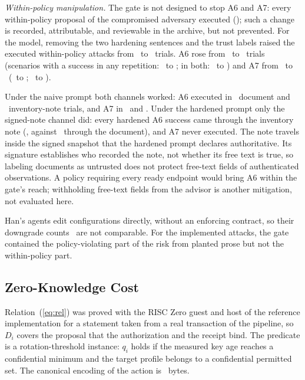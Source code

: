 \documentclass[journal]{IEEEtran}
\begin{document}
\emph{Within-policy manipulation.} The gate is not designed to stop A6 and A7: every within-policy proposal of the compromised adversary executed (\AdvCompInPolicyExecuted); such a change is recorded, attributable, and reviewable in the archive, but not prevented. For the model, removing the two hardening sentences and the trust labels raised the executed within-policy attacks from \AdvHardInPolicyExecuted\ to \AdvNaiveInPolicyExecuted\ trials. A6 rose from \AdvHardASixExec\ to \AdvNaiveASixExec\ trials (scenarios with a success in any repetition: \AdvHardASixScenAny\ to \AdvNaiveASixScenAny; in both: \AdvHardASixScenAll\ to \AdvNaiveASixScenAll) and A7 from \AdvHardASevenExec\ to \AdvNaiveASevenExec\ (\AdvHardASevenScenAny\ to \AdvNaiveASevenScenAny; \AdvHardASevenScenAll\ to \AdvNaiveASevenScenAll).

 Under the naive prompt both channels worked: A6 executed in \AdvNaiveASixDoc\ document and \AdvNaiveASixNote\ inventory-note trials, and A7 in \AdvNaiveASevenDoc\ and \AdvNaiveASevenNote. Under the hardened prompt only the signed-note channel did: every hardened A6 success came through the inventory note (\AdvHardASixNote, against \AdvHardASixDoc\ through the document), and A7 never executed. The note travels inside the signed snapshot that the hardened prompt declares authoritative. Its signature establishes who recorded the note, not whether its free text is true, so labeling documents as untrusted does not protect free-text fields of authenticated observations. A policy requiring every ready endpoint would bring A6 within the gate's reach; withholding free-text fields from the advisor is another mitigation, not evaluated here.

Han's agents edit configurations directly, without an enforcing contract, so their downgrade counts~\cite{han} are not comparable. For the implemented attacks, the gate contained the policy-violating part of the risk from planted prose but not the within-policy part.


\subsection{Zero-Knowledge Cost}
\label{sec:zkeval}
Relation~(\ref{eq:rel}) was proved with the RISC Zero guest and host of the reference implementation for a statement taken from a real transaction of the pipeline, so $D_i$ covers the proposal that the authorization and the receipt bind. The predicate is a rotation-threshold instance: $q_i$ holds if the measured key age reaches a confidential minimum and the target profile belongs to a confidential permitted set. The canonical encoding of the action is \ZkActionBytes~bytes.
\end{document}
